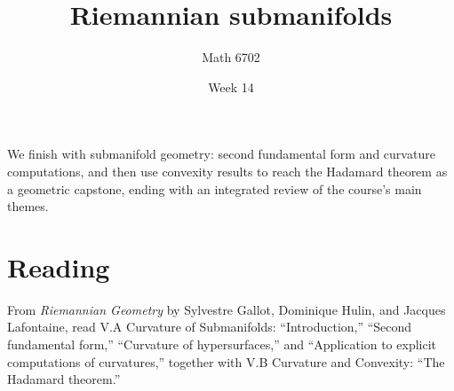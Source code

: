 \documentclass{article}
\title{Riemannian submanifolds}
\author{Math 6702}
\date{Week 14}
\begin{document}
\maketitle

We finish with submanifold geometry: second fundamental form and curvature computations, and then use convexity results to reach the Hadamard theorem as a geometric capstone, ending with an integrated review of the course's main themes.

\section*{Reading}
From \textit{Riemannian Geometry} by Sylvestre Gallot, Dominique Hulin, and Jacques Lafontaine, read \textsection V.A Curvature of Submanifolds: ``Introduction,'' ``Second fundamental form,'' ``Curvature of hypersurfaces,'' and ``Application to explicit computations of curvatures,'' together with \textsection V.B Curvature and Convexity: ``The Hadamard theorem.''
\end{document}
